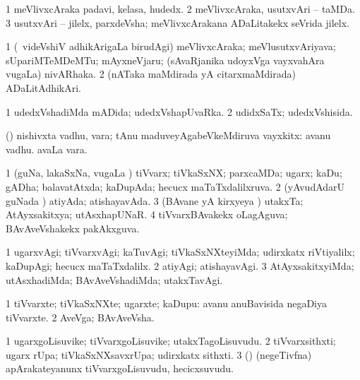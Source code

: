 \bentry
{}
\gl{\nA}
\bmng
\bnum
\num{1} meVlivxcAraka padavi, kelasa, hudedx. 
\num{2} meVlivxcAraka, usutxvAri -- taMDa. 
\num{3} usutxvAri -- jilelx, parxdeVsha; meVlivxcArakana ADaLitakekx seVrida jilelx. 
\enum
\emng
\eentry

\bentry
{}
\gl{\nA}
\bmng
\bnum
\num{1} (\kanmu\ videVshiV adhikArigaLa birudAgi) meVlivxcAraka; meVlusutxvAriyava; sUpariMTeMDeMTu; mAyxneVjaru; (sAvaRjanika udoyxVga vayxvahAra \mo vugaLa) nivARhaka. 
\num{2} (nATaka maMdirada yA citarxmaMdirada) ADaLitAdhikAri. 
\enum
\emng
\eentry

\bentry
{}
\gl{\gu}
\bmng
\bnum
\num{1} udedxVshadiMda mADida; udedxVshapUvaRka. 
\num{2} udidxSaTx; udedxVshisida. 
\enum
\emng
\eentry

\bentry
{}
\gl{\nA}
\bmng
(\AmA) nishivxta vadhu, vara; tAnu maduveyAgabeVkeMdiruva vayxkitx:  avanu vadhu.  avaLa vara. 
\emng
\eentry

\bentry
{}
\gl{\gu}
\bmng
\bnum
\num{1} (guNa, lakaSxNa, \mo vugaLa \vi) tiVvarx; tiVkaSxNX; parxcaMDa; ugarx; kaDu; gADha; balavatAtxda; kaDupAda; hecucx maTaTxdalilxruva. 
\num{2} (yAvudAdarU guNada \vi) atiyAda; atishayavAda. 
\num{3} (BAvane yA kirxyeya \vi) utakxTa; AtAyxsakitxya; utAsxhapUNaR. 
\num{4} tiVvarxBAvakekx oLagAguva; BAvAveVshakekx pakAkxguva. 
\enum
\emng
\eentry

\bentry
{}
\gl{\kirxvi}
\bmng
\bnum
\num{1} ugarxvAgi; tiVvarxvAgi; kaTuvAgi; tiVkaSxNXteyiMda; udirxkatx riVtiyalilx; kaDupAgi; hecucx maTaTxdalilx. 
\num{2} atiyAgi; atishayavAgi. 
\num{3} AtAyxsakitxyiMda; utAsxhadiMda; BAvAveVshadiMda; utakxTavAgi. 
\enum
\emng
\eentry

\bentry
{}
\gl{\nA}
\bmng
\bnum
\num{1} tiVvarxte; tiVkaSxNXte; ugarxte; kaDupu:  avanu anuBavisida negaDiya tiVvarxte. 
\num{2} AveVga; BAvAveVsha. 
\enum
\emng
\eentry

\bentry
{}
\gl{\nA}
\bmng
\bnum
\num{1} ugarxgoLisuvike; tiVvarxgoLisuvike; utakxTagoLisuvudu. 
\num{2} tiVvarxsithxti; ugarx rUpa; tiVkaSxNXsavxrUpa; udirxkatx sithxti. 
\num{3} (\CA) (negeTivfna) apArakateyanunx tiVvarxgoLisuvudu, hecicxsuvudu. 
\enum
\emng
\eentry

